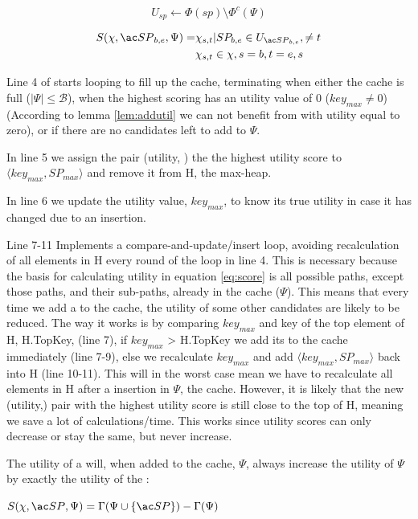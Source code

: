 \begin{equation} \label{eq:usp}
U_{sp} \leftarrow \Phi(sp) \setminus \Phi^c(\Psi)
\end{equation}

\begin{eqnarray} \label{eq:score}
S(\chi, \spath_{b,e}, \Psi) = & \chi_{s,t} | SP_{b,e} \in U_{\spath_{b,e}},\neq t \nonumber \\
			      & \chi_{s,t} \in \chi, s=b, t=e, s 
\end{eqnarray}


Line 4 of \salgo starts looping to fill up the cache, terminating when either the cache is full ($| \Psi | \leq  \mathcal{B}$), when the highest scoring \spath has an utility value of 0 ($key_{max} \neq 0$) (According to lemma \ref{lem:addutil} we can not benefit from \spaths with utility equal to zero), or if there are no \spath candidates left to add to $\Psi$.

In line 5 we assign the pair (utility, \spath) the the highest utility score to $\langle  key_{max},  SP_{max} \rangle$ and remove it from H, the max-heap.

In line 6 we update the utility value, $key_{max}$, to know its true utility in case it has changed due to an \spath insertion.

Line 7-11 Implements a compare-and-update/insert loop, avoiding recalculation of all elements in H every round of the loop in line 4. This is necessary because the basis for calculating utility in equation \ref{eq:score} is all possible paths, except those paths, and their sub-paths, already in the cache ($\Psi$). This means that every time we add a \spath to the cache, the utility of some other candidates are likely to be reduced. The way it works is by comparing $key_{max}$ and key of the top element of H, H.TopKey, (line 7), if $key_{max}$ >  H.TopKey we add its \spath to the cache immediately (line 7-9), else we recalculate $key_{max}$ and add $\langle  key_{max},  SP_{max} \rangle$ back into H (line 10-11). This will in the worst case mean we have to recalculate all elements in H after a \spath insertion in $\Psi$, the cache. However, it is likely that the new (utility,\spath) pair with the highest utility score is still close to the top of H, meaning we save a lot of calculations/time. This works since utility scores can only decrease or stay the same, but never increase.


\begin{lemma}\label{lem:addutil}
The utility of a \spath will, when added to the cache, $\Psi$, always increase the utility of $\Psi$ by exactly the utility of the \spathns:

$S(\chi, \spath, \Psi) = \Gamma(\Psi \cup \{\spath\}) - \Gamma(\Psi)$

\end{lemma}

